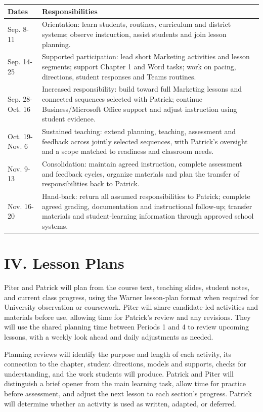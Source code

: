 \documentclass[10pt]{article}
\begin{document}
\begin{longtable}{@{}p{}p{}@{}}
\toprule
\textbf{Dates} & \textbf{Responsibilities} \\
\midrule
\endhead
Sep. 8-11 & Orientation: learn students, routines, curriculum and district systems; observe instruction, assist students and join lesson planning. \\
Sep. 14-25 & Supported participation: lead short Marketing activities and lesson segments; support Chapter 1 and Word tasks; work on pacing, directions, student responses and Teams routines. \\
Sep. 28-Oct. 16 & Increased responsibility: build toward full Marketing lessons and connected sequences selected with Patrick; continue Business/Microsoft Office support and adjust instruction using student evidence. \\
Oct. 19-Nov. 6 & Sustained teaching: extend planning, teaching, assessment and feedback across jointly selected sequences, with Patrick's oversight and a scope matched to readiness and classroom needs. \\
Nov. 9-13 & Consolidation: maintain agreed instruction, complete assessment and feedback cycles, organize materials and plan the transfer of responsibilities back to Patrick. \\
Nov. 16-20 & Hand-back: return all assumed responsibilities to Patrick; complete agreed grading, documentation and instructional follow-up; transfer materials and student-learning information through approved school systems. \\
\bottomrule
\end{longtable}

\section*{IV. Lesson Plans}

Piter and Patrick will plan from the course text, teaching slides, student notes, and current class progress, using the Warner lesson-plan format when required for University observation or coursework. Piter will share candidate-led activities and materials before use, allowing time for Patrick's review and any revisions. They will use the shared planning time between Periods 1 and 4 to review upcoming lessons, with a weekly look ahead and daily adjustments as needed.

Planning reviews will identify the purpose and length of each activity, its connection to the chapter, student directions, models and supports, checks for understanding, and the work students will produce. Patrick and Piter will distinguish a brief opener from the main learning task, allow time for practice before assessment, and adjust the next lesson to each section's progress. Patrick will determine whether an activity is used as written, adapted, or deferred.
\end{document}
